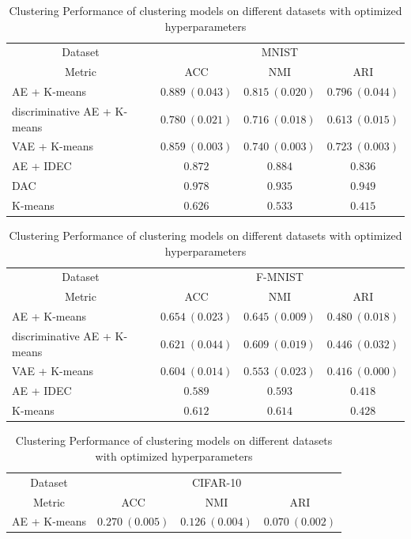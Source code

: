 \documentclass[12pt,DIV14,BCOR12mm,a4paper,footexclude,headinclude,halfparskip-,twoside,openright,cleardoubleempty,idxtotoc,bibtotoc,listtotoc,abstracton]{scrreprt} %
\numberwithin{equation}{chapter}
\begin{document}
	\begin{table}[htb!]
    		\caption{Clustering Performance of clustering models on different datasets with optimized hyperparameters}
    		\label{tab:ClusterPerformance_Models_final}
    		\centering
    		\begin{tabular}{l|ccc}
    			\toprule
    			\multicolumn{1}{c}{Dataset} & \multicolumn{3}{c}{MNIST}\\
        		\multicolumn{1}{c}{Metric} & ACC & NMI & ARI\\
        		\midrule
    			AE + K-means & $\mathbf{0.889}\ (0.043)$ & $0.815\ (0.020)$ & $0.796\ (0.044)$\\
        		discriminative AE + K-means & $0.780\ (0.021)$ & $0.716\ (0.018)$ & $0.613\ (0.015)$\\
        		VAE + K-means& $0.859\ (0.003)$ & $0.740\ (0.003)$ & $0.723\ (0.003)$\\
        		AE + IDEC & $0.872$ & $\mathbf{0.884}$ & $\mathbf{0.836}$\\
        		DAC & $0.978$ & $0.935$ & $0.949$\\
        		K-means & $0.626$ & $0.533$ & $0.415$\\
    		\end{tabular}
    		\begin{tabular}{l|ccc}
    			\toprule
    			\multicolumn{1}{c}{Dataset} & \multicolumn{3}{c}{F-MNIST}\\
        		\multicolumn{1}{c}{Metric} & ACC & NMI & ARI\\
        		\midrule
    			AE + K-means & $\mathbf{0.654}\ (0.023)$ & $\mathbf{0.645}\ (0.009)$ & $\mathbf{0.480}\ (0.018)$\\
        		discriminative AE + K-means & $0.621\ (0.044)$ & $0.609\ (0.019)$ & $0.446\ (0.032)$\\
        		VAE + K-means & $0.604\ (0.014)$ & $0.553\ (0.023)$ & $0.416\ (0.000)$\\
        		AE + IDEC & $0.589$ & $0.593$ & $0.418$\\
        		K-means & $0.612$ & $0.614$ & $0.428$\\
    		\end{tabular}
    		\begin{tabular}{l|ccc}
    			\toprule
    			\multicolumn{1}{c}{Dataset} & \multicolumn{3}{c}{CIFAR-10}\\
        		\multicolumn{1}{c}{Metric} & ACC & NMI & ARI\\
        		\midrule
    			AE + K-means & $\mathbf{0.270}\ (0.005)$ & $\mathbf{0.126}\ (0.004)$ & $0.070\ (0.002)$\\

\end{tabular}
\end{table}
\end{document}
